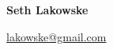 \documentclass{article}
\begin{document}
  \begin{center}

    \Large
    \textbf{Seth Lakowske} \\
    \normalsize

    \href{mailto:lakowske@gmail.com}{lakowske@gmail.com}
		      
    \medskip
    

  \end{center}
  
\end{document}
